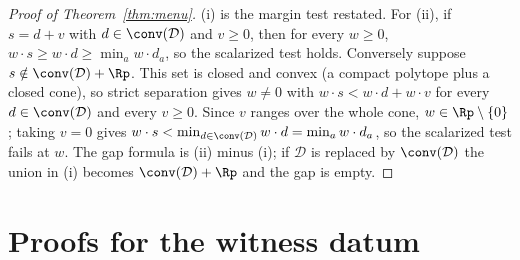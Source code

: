 \begin{proof}[Proof of Theorem~\ref{thm:menu}]
(i) is the margin test restated. For (ii), if $s=d+v$ with $d\in\conv(\mathcal D)$ and $v\ge0$, then for every $w\ge0$, $w\cdot s\ge w\cdot d\ge\min_aw\cdot d_a$, so the scalarized test holds. Conversely suppose $s\notin\conv(\mathcal D)+\Rp$. This set is closed and convex (a compact polytope plus a closed cone), so strict separation gives $w\ne0$ with $w\cdot s<w\cdot d+w\cdot v$ for every $d\in\conv(\mathcal D)$ and every $v\ge0$. Since $v$ ranges over the whole cone, $w\in\Rp\setminus\{0\}$; taking $v=0$ gives $w\cdot s<\min_{d\in\conv(\mathcal D)}w\cdot d=\min_aw\cdot d_a$, so the scalarized test fails at $w$. The gap formula is (ii) minus (i); if $\mathcal D$ is replaced by $\conv(\mathcal D)$ the union in (i) becomes $\conv(\mathcal D)+\Rp$ and the gap is empty.
\end{proof}

\section{Proofs for the witness datum}\label{app:witness}

